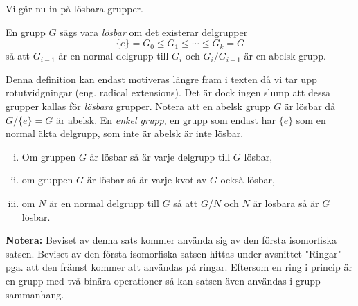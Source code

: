 \documentclass{article}
\theoremstyle{definition}
\begin{document}
Vi går nu in på lösbara grupper. 
\begin{mydef}{}{}
  En grupp $G$ sägs vara \textit{lösbar} om det existerar delgrupper 
  \[ \{e\} = G_0 \leq G_1 \leq \cdots \leq G_k = G \]
  så att $G_{i-1}$ är en normal delgrupp till $G_i$ och $G_i/G_{i-1}$ är en abelsk grupp.
\end{mydef}

Denna definition kan endast motiveras längre fram i texten då vi tar upp rotutvidgningar (eng. radical extensions). 
Det är dock ingen slump att dessa grupper kallas för \textit{lösbara} grupper. Notera att en abelsk grupp $G$ är lösbar
då $G/\{e\} = G$ är abelsk. En \textit{enkel grupp}, en grupp som endast har $\{e\}$ som en normal äkta delgrupp, som inte är abelsk är inte lösbar.  

\begin{mytheo}{}{}
  \begin{enumerate}[(i)]
    \item Om gruppen $G$ är lösbar så är varje delgrupp till $G$ lösbar,
    \item om gruppen $G$ är lösbar så är varje kvot av $G$ också lösbar, 
    \item om $N$ är en normal delgrupp till $G$ så att $G/N$ och $N$ är lösbara så är $G$ lösbar.
  \end{enumerate}
\end{mytheo}

\textbf{Notera:} Beviset av denna sats kommer använda sig av den första isomorfiska satsen. Beviset av den första isomorfiska satsen 
hittas under avsnittet "Ringar" pga. att den främst kommer att användas på ringar. Eftersom en ring i princip är en grupp med två binära operationer 
så kan satsen även användas i grupp sammanhang. 
\end{document}
